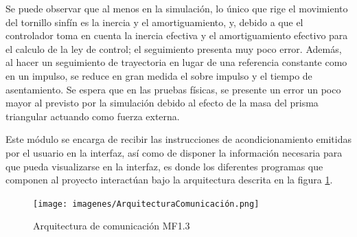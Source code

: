 Se puede observar que al menos en la simulación, lo único que rige el movimiento del tornillo sinfín es la inercia y el amortiguamiento, y, debido a que el controlador toma en cuenta la inercia efectiva y el amortiguamiento efectivo para el calculo de la ley de control; el seguimiento presenta muy poco error. Además, al hacer un seguimiento de trayectoria en lugar de una referencia constante como en un impulso, se reduce en gran medida el sobre impulso y el tiempo de asentamiento. Se espera que en las pruebas físicas, se presente un error un poco mayor al previsto por la simulación debido al efecto de la masa del prisma triangular actuando como fuerza externa. \\



Este módulo se encarga de recibir las instrucciones de acondicionamiento emitidas por el usuario en la interfaz, así como de disponer la información necesaria para que pueda visualizarse en la interfaz, es donde los diferentes programas que componen al proyecto interactúan bajo la arquitectura descrita en la figura \ref{fig:ArquitecturaComunicacion}.\\

\begin{figure}[h]
    \centering
    \texttt{[image: imagenes/ArquitecturaComunicación.png]}
    \caption{Arquitectura de comunicación MF1.3}
    \label{fig:ArquitecturaComunicacion}
\end{figure}

